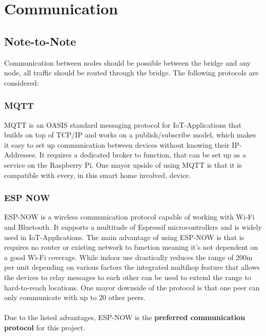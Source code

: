 
    \section{Communication}
    
        \subsection{Note-to-Note}
        Communication between nodes should be possible between the bridge and
        any node, all traffic should be routed through the bridge.
        The following protocols are considered:
            \subsubsection{MQTT}
            MQTT \cite{mqtt_nodate} is an OASIS standard messaging protocol for 
            IoT-Applications that builds on top of TCP/IP and 
            works on a publish/subscribe model, which makes it easy
            to set up communication between devices without knowing
            their IP-Addresses. It requires a dedicated broker to
            function, that can be set up as a service on the 
            Raspberry Pi.
            One mayor upside of using MQTT is that it is compatible
            with every, in this smart home involved, device.
        
        
            \subsubsection{ESP NOW} 
            ESP-NOW is a wireless communication protocol capable of
            working with Wi-Fi and Bluetooth. It supports a 
            multitude of Espressif microcontrollers and is widely 
            used in IoT-Applications. The main advantage of using
            ESP-NOW is that is requires no router or existing
            network to function meaning it's not dependent on
            a good Wi-Fi coverage. While indoor use drastically
            reduces the range of 200m per unit depending on various
            factors \cite{esp-now-reach_2024} 
            the integrated multihop feature that allows the devices 
            to relay messages to each other can be used to extend 
            the range to hard-to-reach locations. One mayor downside
            of the protocol is that one peer can only communicate with
            up to 20 other peers.
            \\~\\
            Due to the listed advantages, ESP-NOW is the \textbf{preferred
            communication protocol} for this project.

